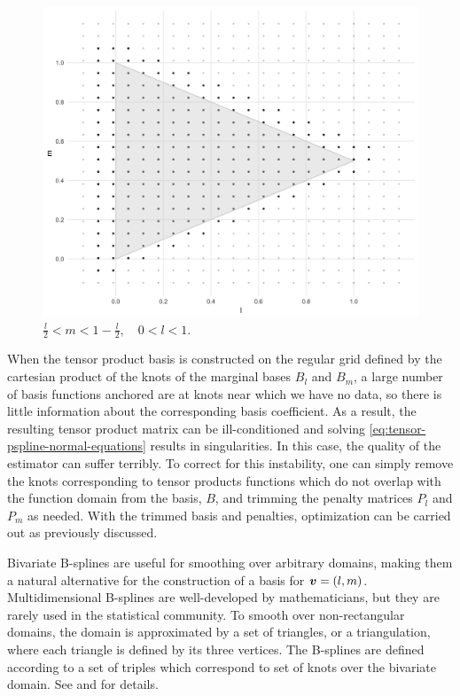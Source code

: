 \begin{figure}[H]
    \graphicspath{{img/}}
 \includegraphics[scale=0.2]{knot-removal-on-triangle-domain.png}
 \caption{$\frac{l}{2} < m < 1 - \frac{l}{2}, \quad 0 < l < 1.$} \label{fig:triangle-domain}
 \end{figure}

When the tensor product basis is constructed on the regular grid defined by the cartesian product of the knots of the marginal bases $B_l$ and $B_m$, a large number of basis functions anchored are at knots near which we have no data, so there is little information about the corresponding basis coefficient. As a result, the resulting tensor product matrix can be ill-conditioned and solving \eqref{eq:tensor-pspline-normal-equations} results in singularities. In this case, the quality of the estimator can suffer terribly. To correct for this instability, one can simply remove the knots corresponding to tensor products functions which do not overlap with the function domain from the basis, $B$, and trimming the penalty matrices $P_l$ and $P_m$ as needed. With the trimmed basis and penalties, optimization can be carried out as previously discussed. 

\bigskip

Bivariate B-splines are useful for smoothing over arbitrary domains, making them a natural alternative for the construction of a basis for $\mbox{\boldmath $v$} = \left(l,m\right)$. Multidimensional B-splines are well-developed by mathematicians, but they are rarely used in the statistical community. To smooth over non-rectangular domains, the domain is approximated by a set of triangles, or a triangulation, where each triangle is defined by its three vertices. The B-splines are defined according to a set of triples which correspond to set of knots over the bivariate domain. See \citet{dahmen1992blossoming} and \citet{seidel1991symmetric} for details. 


